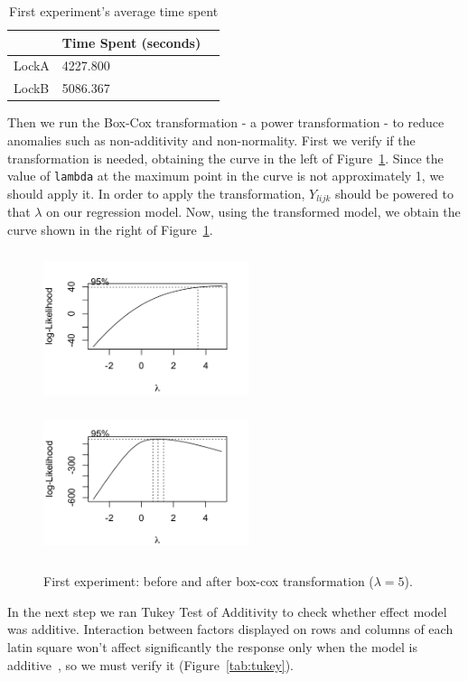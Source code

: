 \begin{table}
\centering
\begin{tabular}{|l|l|l|}
\hline
 & Time Spent (seconds)\\
\hline
LockA & 4227.800 \\
LockB & 5086.367 \\
\hline
\end{tabular}
\caption{First experiment's average time spent}\label{tab:mean1}
\end{table}

Then we run the Box-Cox transformation - a power transformation - to reduce anomalies such as non-additivity and non-normality.
First we verify if the transformation is needed, obtaining the curve in the left of Figure~\ref{fig:transf1}.
Since the value of {\tt lambda} at the maximum point in the curve is not approximately 1, we should apply it.
In order to apply the transformation, $Y_{lijk}$ should be powered to that $\lambda$ on our regression model.
Now, using the transformed model, we obtain the curve shown in the right of Figure~\ref{fig:transf1}.

\begin{figure}
\includegraphics[height=4.5cm, width=6cm]{img/u2.png}
\hfill
\includegraphics[height=4.3cm, width=6cm]{img/u2boxcox.png}
\caption{First experiment: before and after box-cox transformation ($\lambda = 5$).}\label{fig:transf1}
\end{figure}

In the next step we ran Tukey Test of Additivity to check whether effect model was additive.
Interaction between factors displayed on rows and columns of each latin square won't affect significantly the response only when the model is additive~\citep{box},
so we must verify it (Figure~\ref{tab:tukey}).

